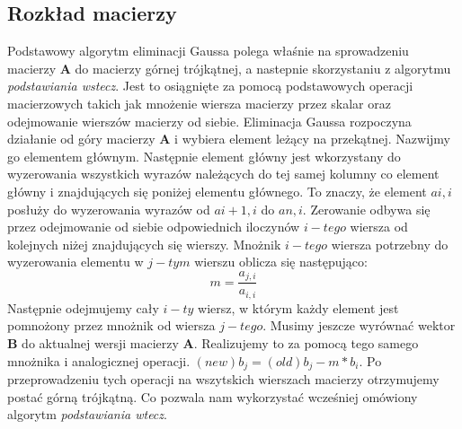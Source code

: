 \documentclass[]{article}
\begin{document}
\subsection{Rozkład macierzy}
Podstawowy algorytm eliminacji Gaussa polega właśnie na sprowadzeniu macierzy $\mathbf{A}$ do macierzy górnej trójkątnej, a nastepnie skorzystaniu z algorytmu \textit{podstawiania wstecz}. Jest to osiągnięte za pomocą podstawowych operacji macierzowych takich jak mnożenie wiersza macierzy przez skalar oraz odejmowanie wierszów macierzy od siebie. Eliminacja Gaussa rozpoczyna działanie od góry macierzy $\mathbf{A}$ i wybiera element leżący na przekątnej. Nazwijmy go elementem głównym. Następnie element główny jest wkorzystany do wyzerowania wszystkich wyrazów należących do tej samej kolumny co element główny i znajdujących się poniżej elementu głównego. To znaczy, że element $a{i,i}$ posłuży do wyzerowania wyrazów od $a{i+1,i}$ do $a{n,i}$. Zerowanie odbywa się przez odejmowanie od siebie odpowiednich iloczynów $i-tego$ wiersza od kolejnych niżej znajdujących się wierszy. Mnożnik $i-tego$ wiersza potrzebny do wyzerowania elementu w $j-tym$ wierszu oblicza się następująco:
\[m = \frac{a_{j,i}}{a_{i,i}}\]
Następnie odejmujemy cały $i-ty$ wiersz, w którym każdy element jest pomnożony przez mnożnik od wiersza $j-tego$. Musimy jeszcze wyrównać wektor $\mathbf{B}$ do aktualnej wersji macierzy $\mathbf{A}$. Realizujemy to za pomocą tego samego mnożnika i analogicznej operacji. $(new)b_j = (old)b_j - m * b_i$. Po przeprowadzeniu tych operacji na wszytskich wierszach macierzy otrzymujemy postać górną trójkątną. Co pozwala nam wykorzystać wcześniej omówiony algorytm \textit{podstawiania wtecz}.
\end{document}
